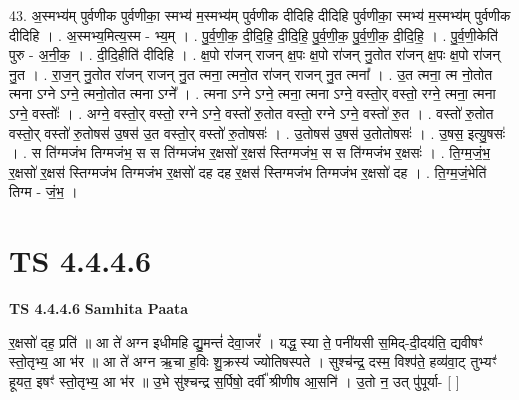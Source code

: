 \documentclass[17pt]{extarticle}
\begin{document}
43. अ॒स्मभ्य॑म् पुर्वणीक पुर्वणीका॒ स्मभ्य॑ म॒स्मभ्य॑म् पुर्वणीक दीदिहि दीदिहि पुर्वणीका॒ स्मभ्य॑ म॒स्मभ्य॑म् पुर्वणीक दीदिहि । . अ॒स्मभ्य॒मित्य॒स्म - भ्य॒म् । . पु॒र्व॒णी॒क॒ दी॒दि॒हि॒ दी॒दि॒हि॒ पु॒र्व॒णी॒क॒ पु॒र्व॒णी॒क॒ दी॒दि॒हि॒ । . पु॒र्व॒णी॒केति॑ पुरु - अ॒नी॒क॒ । . दी॒दि॒हीति॑ दीदिहि । . क्ष॒पो रा॑जन् राजन् क्ष॒पः क्ष॒पो रा॑जन् नु॒तोत रा॑जन् क्ष॒पः क्ष॒पो रा॑जन् नु॒त । . रा॒ज॒न् नु॒तोत रा॑जन् राजन् नु॒त त्मना॒ त्मनो॒त रा॑जन् राजन् नु॒त त्मना᳚ । . उ॒त त्मना॒ त्म नो॒तोत त्मना ऽग्ने ऽग्ने॒ त्मनो॒तोत त्मना ऽग्ने᳚ । . त्मना ऽग्ने ऽग्ने॒ त्मना॒ त्मना ऽग्ने॒ वस्तो॒र् वस्तो॒ रग्ने॒ त्मना॒ त्मना ऽग्ने॒ वस्तोः᳚ । . अग्ने॒ वस्तो॒र् वस्तो॒ रग्ने ऽग्ने॒ वस्तो॑ रु॒तोत वस्तो॒ रग्ने ऽग्ने॒ वस्तो॑ रु॒त । . वस्तो॑ रु॒तोत वस्तो॒र् वस्तो॑ रु॒तोषस॑ उ॒षस॑ उ॒त वस्तो॒र् वस्तो॑ रु॒तोषसः॑ । . उ॒तोषस॑ उ॒षस॑ उ॒तोतोषसः॑ । . उ॒षस॒ इत्यु॒षसः॑ । . स ति॑ग्मजंभ तिग्मजंभ॒ स स ति॑ग्मजंभ र॒क्षसो॑ र॒क्षस॑ स्तिग्मजंभ॒ स स ति॑ग्मजंभ र॒क्षसः॑ । . ति॒ग्म॒जं॒भ॒ र॒क्षसो॑ र॒क्षस॑ स्तिग्मजंभ तिग्मजंभ र॒क्षसो॑ दह दह र॒क्षस॑ स्तिग्मजंभ तिग्मजंभ र॒क्षसो॑ दह । . ति॒ग्म॒जं॒भेति॑ तिग्म - जं॒भ॒ । \newline
\pagebreak
{}

\section{ TS 4.4.4.6 }

\textbf{TS 4.4.4.6 } \newline
\textbf{Samhita Paata} \newline

र॒क्षसो॑ दह॒ प्रति॑ ॥ आ ते॑ अग्न इधीमहि द्यु॒मन्तं॑ देवा॒जरं᳚ । यद्ध॒ स्या ते॒ पनी॑यसी स॒मिद्-दी॒दय॑ति॒ द्यवीषꣳ॑ स्तो॒तृभ्य॒ आ भ॑र ॥ आ ते॑ अग्न ऋ॒चा ह॒विः शु॒क्रस्य॑ ज्योतिषस्पते । सुश्च॑न्द्र॒ दस्म॒ विश्प॑ते॒ हव्य॑वा॒ट् तुभ्यꣳ॑ हूयत॒ इषꣳ॑ स्तो॒तृभ्य॒ आ भ॑र ॥ उ॒भे सु॑श्चन्द्र स॒र्पिषो॒ दर्वी᳚ श्रीणीष आ॒सनि॑ । उ॒तो न॒ उत् पु॑पूर्या- [  ] \newline
\end{document}
